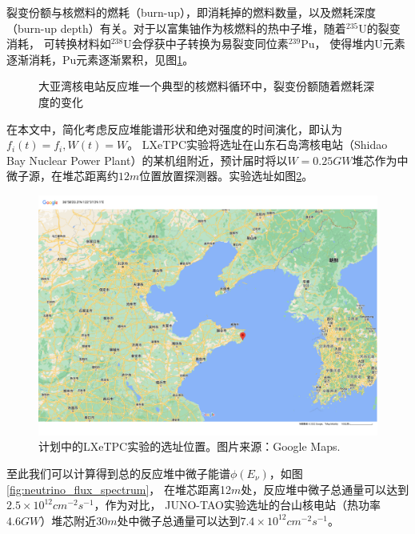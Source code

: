 裂变份额与核燃料的燃耗（burn-up），即消耗掉的燃料数量，以及燃耗深度（burn-up depth）有关。对于以富集铀作为核燃料的热中子堆，随着${}^{235}\mathrm{U}$的裂变消耗，
可转换材料如${}^{238}\mathrm{U}$会俘获中子转换为易裂变同位素${}^{239}\mathrm{Pu}$，
使得堆内$\mathrm{U}$元素逐渐消耗，$\mathrm{Pu}$元素逐渐累积，见图\ref{fig:fission_fraction}。

\begin{figure}
    \centering
    
    \caption{\label{fig:fission_fraction} 大亚湾核电站反应堆一个典型的核燃料循环中，裂变份额随着燃耗深度的变化\cite{an_evolution_2017}}
\end{figure}

在本文中，简化考虑反应堆能谱形状和绝对强度的时间演化，即认为$f_i(t)=f_i,W(t)=W$。
LXeTPC实验将选址在山东石岛湾核电站（Shidao Bay Nuclear Power Plant）的某机组附近，预计届时将以$W=0.25\si{GW}$堆芯作为中微子源，在堆芯距离约$12\si{m}$位置放置探测器。实验选址如图\ref{fig:shidaowan}。

\begin{figure}
    \centering
    \includegraphics[width=1.0\linewidth]{figures/shidaowan.pdf}
    \caption{\label{fig:shidaowan} 计划中的LXeTPC实验的选址位置。图片来源：Google Maps.\cite{shidaowan_googlemap_220524}}
\end{figure}

至此我们可以计算得到总的反应堆中微子能谱$\phi\left(E_\nu\right)$，如图\ref{fig:neutrino_flux_spectrum}，
在堆芯距离12$\si{m}$处，反应堆中微子总通量可以达到$2.5\times 10^{12}\si{cm^{-2}s^{-1}}$，作为对比，
JUNO-TAO实验选址的台山核电站（热功率$4.6\si{GW}$）堆芯附近$30\si{m}$处中微子总通量可以达到$7.4\times 10^{12}\si{cm^{-2}s^{-1}}$\cite{juno_collaboration_tao_2020}。

